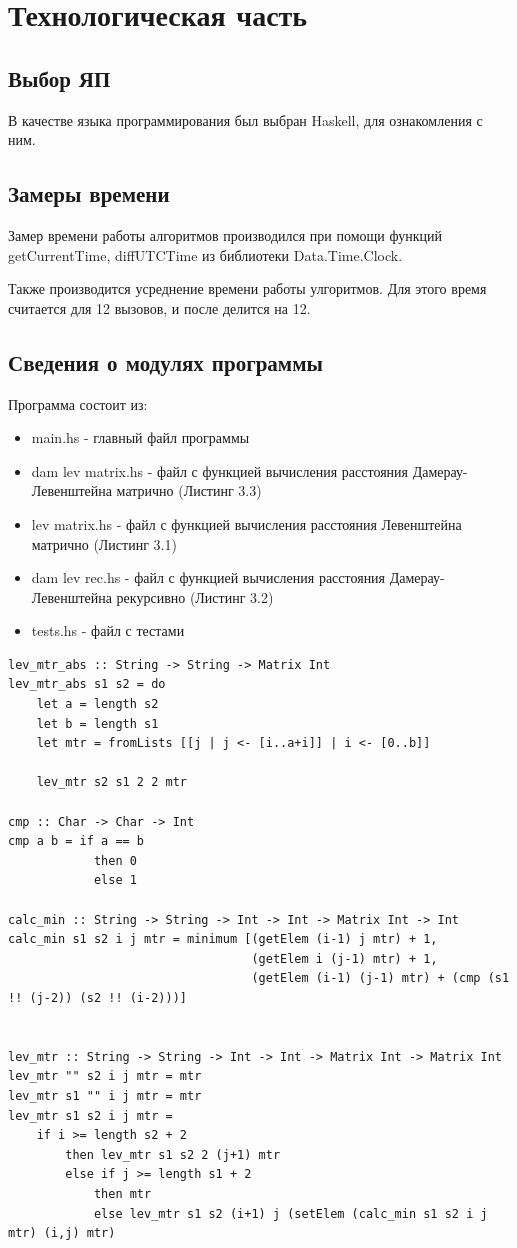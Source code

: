 \documentclass[12pt]{report}
\begin{document}
\chapter{Технологическая часть}
\section{Выбор ЯП}
В качестве языка программирования был выбран Haskell, для ознакомления с ним.

\section{Замеры времени}
Замер времени работы алгоритмов производился при помощи функций getCurrentTime, diffUTCTime из библиотеки Data.Time.Clock.

Также производится усреднение времени работы улгоритмов. Для этого время считается для 12 вызовов, и после делится на 12.

\section{Сведения о модулях программы}
Программа состоит из:
\begin{itemize}
	\item main.hs - главный файл программы
	\item dam lev matrix.hs - файл с функцией вычисления расстояния Дамерау-Левенштейна матрично (Листинг 3.3)
	\item lev matrix.hs - файл с функцией вычисления расстояния Левенштейна матрично (Листинг 3.1)
	\item dam lev rec.hs - файл с функцией вычисления расстояния Дамерау-Левенштейна рекурсивно (Листинг 3.2)
	\item tests.hs - файл с тестами 
\end{itemize}

\begin{lstlisting}[label=some-code,caption=Функция нахождения расстояния Левенштейна матрично]
lev_mtr_abs :: String -> String -> Matrix Int
lev_mtr_abs s1 s2 = do
    let a = length s2
    let b = length s1
    let mtr = fromLists [[j | j <- [i..a+i]] | i <- [0..b]]
    
    lev_mtr s2 s1 2 2 mtr

cmp :: Char -> Char -> Int
cmp a b = if a == b
            then 0
            else 1

calc_min :: String -> String -> Int -> Int -> Matrix Int -> Int
calc_min s1 s2 i j mtr = minimum [(getElem (i-1) j mtr) + 1, 
                                  (getElem i (j-1) mtr) + 1,
                                  (getElem (i-1) (j-1) mtr) + (cmp (s1 !! (j-2)) (s2 !! (i-2)))]

                                
lev_mtr :: String -> String -> Int -> Int -> Matrix Int -> Matrix Int
lev_mtr "" s2 i j mtr = mtr
lev_mtr s1 "" i j mtr = mtr
lev_mtr s1 s2 i j mtr = 
    if i >= length s2 + 2
        then lev_mtr s1 s2 2 (j+1) mtr
        else if j >= length s1 + 2
            then mtr
            else lev_mtr s1 s2 (i+1) j (setElem (calc_min s1 s2 i j mtr) (i,j) mtr)
\end{lstlisting}
\end{document}
